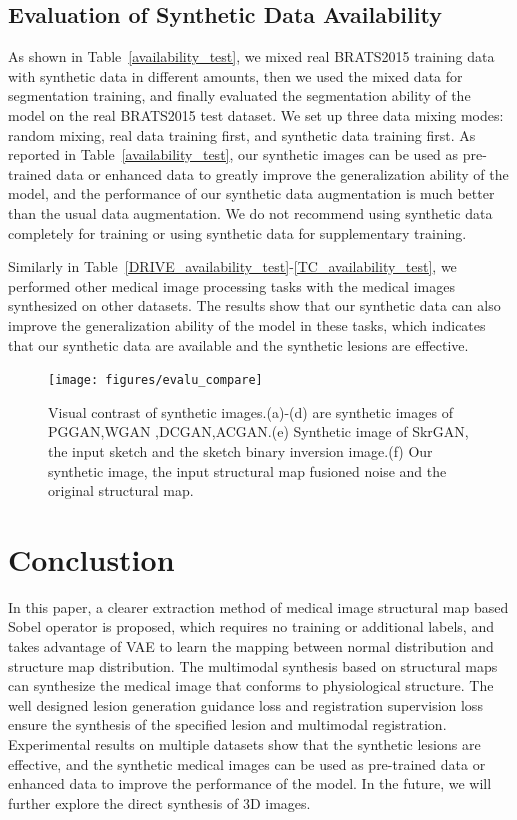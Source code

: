 \documentclass[runningheads]{llncs}
\begin{document}
	\subsection{Evaluation of Synthetic Data Availability}
	As shown in Table~\ref{availability_test}, we mixed real BRATS2015 training data with synthetic data in different amounts, then we used the mixed data for segmentation training, and finally evaluated the segmentation ability of the model on the real BRATS2015 test dataset. We set up three data mixing modes: random mixing, real data training first, and synthetic data training first. As reported in Table~\ref{availability_test}, our synthetic images can be used as pre-trained data or enhanced data to greatly improve the generalization ability of the model, and the performance of our synthetic data augmentation is much better than the usual data augmentation. We do not recommend using synthetic data completely for training or using synthetic data for supplementary training.

	Similarly in Table~\ref{DRIVE_availability_test}-\ref{TC_availability_test}, we performed other medical image processing tasks with the medical images synthesized on other datasets. The results show that our synthetic data can also improve the generalization ability of the model in these tasks, which indicates that our synthetic data are available and the synthetic lesions are effective.
	\begin{figure}[th]
		\centering
		\texttt{[image: figures/evalu\_compare]}
		\caption{Visual contrast of synthetic images.(a)-(d) are synthetic images of PGGAN\cite{100karras2017progressive,96zhang2019skrgan:},WGAN \cite{99arjovsky2017wasserstein,96zhang2019skrgan:},DCGAN\cite{97radford2015unsupervised,96zhang2019skrgan:},ACGAN\cite{98odena2016conditional,96zhang2019skrgan:}.(e) Synthetic image of SkrGAN\cite{96zhang2019skrgan:}, the input sketch and the sketch binary inversion image.(f) Our synthetic image, the input structural map fusioned noise and the original structural map.}
		\label{evalu_compare}
	\end{figure}
	\section{Conclustion}
	In this paper, a clearer extraction method of medical image structural map based Sobel operator is proposed, which requires no training or additional labels, and takes advantage of VAE to learn the mapping between normal distribution and structure map distribution. The multimodal synthesis based on structural maps can synthesize the medical image that conforms to physiological structure. The well designed lesion generation guidance loss and registration supervision loss ensure the synthesis of the specified lesion and multimodal registration. Experimental results on multiple datasets show that the synthetic lesions are effective, and the synthetic medical images can be used as pre-trained data or enhanced data to improve the performance of the model. In the future, we will further explore the direct synthesis of 3D images.
	
		
\end{document}
